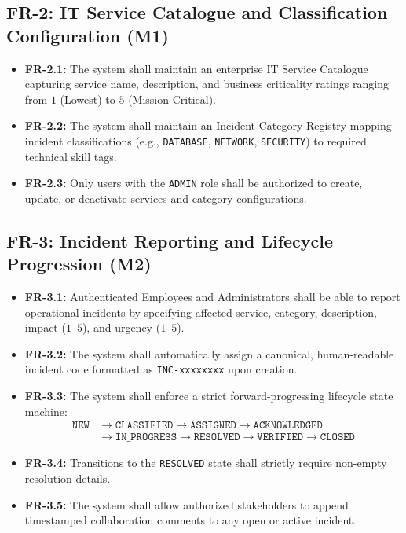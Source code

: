 \documentclass[11pt,a4paper,oneside]{report}
\begin{document}
\subsection{FR-2: IT Service Catalogue and Classification Configuration (M1)}
\begin{itemize}
    \item \textbf{FR-2.1:} The system shall maintain an enterprise IT Service Catalogue capturing service name, description, and business criticality ratings ranging from $1$ (Lowest) to $5$ (Mission-Critical).
    \item \textbf{FR-2.2:} The system shall maintain an Incident Category Registry mapping incident classifications (e.g., \texttt{DATABASE}, \texttt{NETWORK}, \texttt{SECURITY}) to required technical skill tags.
    \item \textbf{FR-2.3:} Only users with the \texttt{ADMIN} role shall be authorized to create, update, or deactivate services and category configurations.
\end{itemize}

\subsection{FR-3: Incident Reporting and Lifecycle Progression (M2)}
\begin{itemize}
    \item \textbf{FR-3.1:} Authenticated Employees and Administrators shall be able to report operational incidents by specifying affected service, category, description, impact ($1$--$5$), and urgency ($1$--$5$).
    \item \textbf{FR-3.2:} The system shall automatically assign a canonical, human-readable incident code formatted as \texttt{INC-xxxxxxxx} upon creation.
    \item \textbf{FR-3.3:} The system shall enforce a strict forward-progressing lifecycle state machine:
    \[
    \begin{aligned}
        \texttt{NEW} &\longrightarrow \texttt{CLASSIFIED} \longrightarrow \texttt{ASSIGNED} \longrightarrow \texttt{ACKNOWLEDGED} \\
        &\longrightarrow \texttt{IN\_PROGRESS} \longrightarrow \texttt{RESOLVED} \longrightarrow \texttt{VERIFIED} \longrightarrow \texttt{CLOSED}
    \end{aligned}
    \]
    \item \textbf{FR-3.4:} Transitions to the \texttt{RESOLVED} state shall strictly require non-empty resolution details.
    \item \textbf{FR-3.5:} The system shall allow authorized stakeholders to append timestamped collaboration comments to any open or active incident.
\end{itemize}
\end{document}
